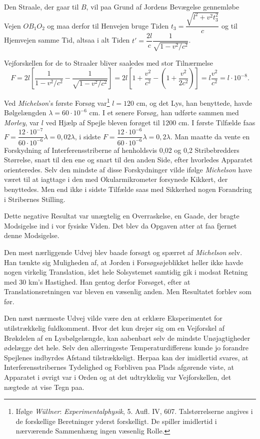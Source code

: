 \documentclass[12pt,a4paper]{article}
\newcommand{\opage}[1]{\marginnote{\footnotesize\textit{[#1]}}}
\begin{document}
Den Straale, der gaar til $B$, vil paa Grund af Jordens Bevægelse gennemløbe
Vejen $OB_{1}O_{2}$ og maa derfor til Henvejen bruge Tiden
$t_{3} = \dfrac{\sqrt{l^{2}+v^{2}t_{3}^{2}}}{c}$ og til Hjemvejen samme Tid,
altsaa i alt Tiden $t' = \dfrac{2l}{c}\dfrac{1}{\sqrt{1-v^{2}/c^{2}}}$.

\opage{6} Vejforskellen for de to Straaler bliver saaledes med stor Tilnærmelse
\[
  F = 2l\left[\frac{1}{1-v^{2}/c^{2}} - \frac{1}{\sqrt{1-v^{2}/c^{2}}}\right]
    = 2l\left[1+\frac{v^{2}}{c^{2}}
      - \left(1+\frac{v^{2}}{2c^{2}}\right)\right]
    = l\frac{v^{2}}{c^{2}} = l\cdot 10^{-8}.
\]

Ved \emph{Michelson}'s første Forsøg var\footnote{Ifølge \emph{Wüllner}:
\emph{Experimentalphysik}, 5. Aufl. IV, 607. Talstørrelserne angives i de
forskellige Beretninger yderst forskelligt. De spiller imidlertid i
nærværende Sammenhæng ingen væsenlig Rolle.} $l = 120$ cm, og det Lys, han
benyttede, havde Bølgelængden $\lambda = 60\cdot 10^{-6}$ cm. I et senere
Forsøg, han udførte sammen med \emph{Morley}, var $l$ ved Hjælp af Spejle
bleven forøget til 1200 cm. I første Tilfælde faas
$F = \dfrac{12\cdot 10^{-7}}{60\cdot 10^{-6}}\lambda = 0{,}02\lambda$, i sidste
$F = \dfrac{12\cdot 10^{-6}}{60\cdot 10^{-6}}\lambda = 0{,}2\lambda$. Man
maatte da vente en Forskydning af Interferensstriberne af henholdsvis 0,02 og
0,2 Stribebredders Størrelse, snart til den ene og snart til den anden Side,
efter hvorledes Apparatet orienteredes. Selv den mindste af disse
Forskydninger vilde ifølge \emph{Michelson} have været til at iagttage i den
med Okularmikrometer forsynede Kikkert, der benyttedes. Men end ikke i sidste
Tilfælde saas med Sikkerhed nogen Forandring i Stribernes Stilling.

Dette negative Resultat var unægtelig en Overraskelse, en Gaade, der bragte
Modsigelse ind i vor fysiske Viden. Det blev da Opgaven atter at faa fjernet
denne Modsigelse.

Den mest nærliggende Udvej blev baade forsøgt og spærret af \emph{Michelson}
selv. Han tænkte sig Muligheden af, at Jorden i Forsøgsøjeblikket heller ikke
havde nogen virkelig Translation, idet hele Solsystemet samtidig gik i modsat
Retning med 30 km's Hastighed. Han gentog derfor Forsøget, efter at
Translationsretningen var bleven en væsenlig anden. Men Resultatet forblev som
før.

Den næst nærmeste Udvej vilde være den at erklære Eksperimentet for
utilstrækkelig fuldkomment. Hvor det kun drejer sig om en Vejforskel af
Brøkdelen af en Lysbølgelængde, kan aabenbart selv de mindste Unøjagtigheder
ødelægge det hele. Selv den allerringeste Temperaturdifferens kunde jo
forandre Spejlenes indbyrdes Afstand tilstrækkeligt. Herpaa kan der imidlertid
svares, at Interferensstribernes Tydelighed og Forbliven paa Plads afgørende
viste,
\opage{7} at Apparatet i øvrigt var i Orden og at det udtrykkelig var Vejforskellen, det
nægtede at vise Tegn paa.
\end{document}
